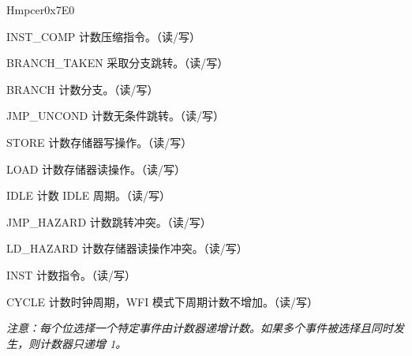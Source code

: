 \begin{register}{H}{mpcer}{0x7E0}\label{regdesc:MPCER}
%
%
%
%
%
%
%
%
%
%
%
%
\regnewline%
\begin{regdesc}\begin{reglist}
\label{fielddesc:INST_COMP}\item [INST\_COMP] 计数压缩指令。（读/写）
\label{fielddesc:BRANCH_TAKEN}\item [BRANCH\_TAKEN] 采取分支跳转。（读/写）  
\label{fielddesc:BRANCH}\item [BRANCH] 计数分支。（读/写） 
\label{fielddesc:JUMP_UNCONDITIONAL}\item [JMP\_UNCOND] 计数无条件跳转。（读/写） 
\label{fielddesc:STORE}\item [STORE] 计数存储器写操作。（读/写） 
\label{fielddesc:LOAD}\item  [LOAD] 计数存储器读操作。（读/写） 
\label{fielddesc:IDLE}\item  [IDLE] 计数 IDLE 周期。（读/写） 
\label{fielddesc:JUMP_HAZARDS}\item  [JMP\_HAZARD] 计数跳转冲突。（读/写） 
\label{fielddesc:LOAD_HAZARDS}\item  [LD\_HAZARD] 计数存储器读操作冲突。（读/写） 
\label{fielddesc:INSTRUCTION}\item  [INST] 计数指令。（读/写） 
\label{fielddesc:CYCLES}\item  [CYCLE] 计数时钟周期，WFI 模式下周期计数不增加。（读/写）

\textit{注意：每个位选择一个特定事件由计数器递增计数。如果多个事件被选择且同时发生，则计数器只递增 1。 }

\end{reglist}\end{regdesc}
\end{register}

